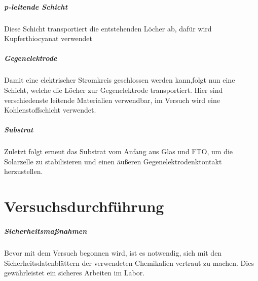 \documentclass[12pt,a4paper,ngerman]{report}
\begin{document}
	\paragraph{p-leitende Schicht}
	Diese Schicht transportiert die entstehenden Löcher ab, dafür wird Kupferthiocyanat  verwendet
	\paragraph{Gegenelektrode}
	Damit eine elektrischer Stromkreis geschlossen werden kann,folgt nun eine Schicht, welche die Löcher zur Gegenelektrode transportiert. Hier sind verschiedenste leitende Materialien verwendbar, im Versuch wird eine Kohlenstoffschicht verwendet.
	\paragraph{Substrat}
	Zuletzt folgt erneut das Substrat vom Anfang aus Glas und FTO, um die Solarzelle zu stabilisieren und einen äußeren Gegenelektrodenktontakt herzustellen.
	
		



	

\chapter{Versuchsdurchführung}
	\paragraph*{Sicherheitsmaßnahmen}
	Bevor mit dem Versuch begonnen wird, ist es notwendig, sich mit den Sicherheitsdatenblättern der verwendeten Chemikalien vertraut zu machen. Dies gewährleistet ein sicheres Arbeiten im Labor.
\end{document}
